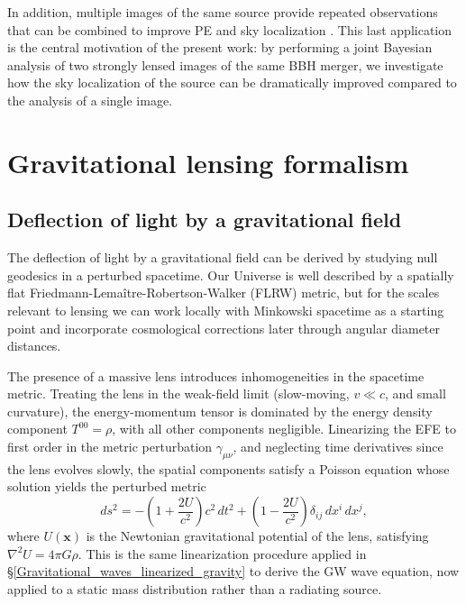 In addition, multiple images of the same source provide repeated observations that can be combined to improve PE and sky localization \cite{hubble_constant_lensing, Chen_2025}. This last application is the central motivation of the present work: by performing a joint Bayesian analysis of two strongly lensed images of the same BBH merger, we investigate how the sky localization of the source can be dramatically improved compared to the analysis of a single image.


\section{Gravitational lensing formalism}
\label{sec:geometric_optics}



\subsection{Deflection of light by a gravitational field}

The deflection of light by a gravitational field can be derived by studying null geodesics in a perturbed spacetime. Our Universe is well described by a spatially flat Friedmann-Lemaître-Robertson-Walker (FLRW) metric, but for the scales relevant to lensing we can work locally with Minkowski spacetime as a starting point and incorporate cosmological corrections later through angular diameter distances.

The presence of a massive lens introduces inhomogeneities in the spacetime metric. Treating the lens in the weak-field limit (slow-moving, $v \ll c$, and small curvature), the energy-momentum tensor is dominated by the energy density component $T^{00} = \rho$, with all other components negligible. Linearizing the EFE to first order in the metric perturbation $\gamma_{\mu\nu}$, and neglecting time derivatives since the lens evolves slowly, the spatial 
components satisfy a Poisson equation whose solution yields the perturbed metric \cite{lensing_metric}
\begin{equation}
    ds^2 = -\left(1+\frac{2U}{c^2}\right)c^2\,dt^2 + \left(1-\frac{2U}{c^2}\right)\delta_{ij}\,dx^i\,dx^j,
    \label{eq:perturbed_metric}
\end{equation}
where $U(\mathbf{x})$ is the Newtonian gravitational potential of the lens, satisfying $\nabla^2 U = 4\pi G\rho$. This is the same linearization procedure applied in 
\S\ref{Gravitational_waves_linearized_gravity} to derive the 
GW wave equation, now applied to a static mass distribution 
rather than a radiating source.

